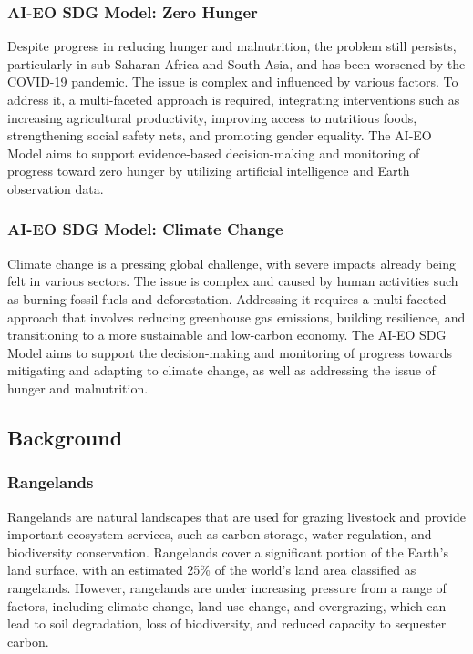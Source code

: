 \documentclass[draft, {\secondLanguage}, english]{volcanica-template}
\begin{document}
\subsubsection{AI-EO SDG Model: Zero Hunger}\label{sec:02aa}
Despite progress in reducing hunger and malnutrition, the problem still persists, particularly in sub-Saharan Africa and South Asia, and has been worsened by the COVID-19 pandemic. The issue is complex and influenced by various factors. To address it, a multi-faceted approach is required, integrating interventions such as increasing agricultural productivity, improving access to nutritious foods, strengthening social safety nets, and promoting gender equality. The AI-EO Model aims to support evidence-based decision-making and monitoring of progress toward zero hunger by utilizing artificial intelligence and Earth observation data.

\subsubsection{AI-EO SDG Model: Climate Change}\label{sec:02ab}
Climate change is a pressing global challenge, with severe impacts already being felt in various sectors. The issue is complex and caused by human activities such as burning fossil fuels and deforestation. Addressing it requires a multi-faceted approach that involves reducing greenhouse gas emissions, building resilience, and transitioning to a more sustainable and low-carbon economy. The AI-EO SDG Model aims to support the decision-making and monitoring of progress towards mitigating and adapting to climate change, as well as addressing the issue of hunger and malnutrition.

\subsection{Background}\label{sec:02b}
\subsubsection{Rangelands}\label{sec:02ba}
Rangelands are natural landscapes that are used for grazing livestock and provide important ecosystem services, such as carbon storage, water regulation, and biodiversity conservation. Rangelands cover a significant portion of the Earth's land surface, with an estimated 25\% of the world's land area classified as rangelands. However, rangelands are under increasing pressure from a range of factors, including climate change, land use change, and overgrazing, which can lead to soil degradation, loss of biodiversity, and reduced capacity to sequester carbon.
\end{document}
